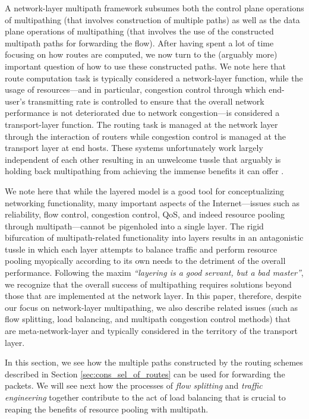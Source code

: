 \documentclass[10pt]{IEEEtran}
\begin{document}
A network-layer multipath framework subsumes both the control plane operations of multipathing (that involves construction of multiple paths) as well as the data plane operations of multipathing (that involves the use of the constructed multipath paths for forwarding the flow). After having spent a lot of time focusing on how routes are computed, we now turn to the (arguably more) important question of how to use these constructed paths. We note here that route computation task is typically considered a network-layer function, while the usage of resources---and in particular, congestion control through which end-user's transmitting rate is controlled to ensure that the overall network performance is not deteriorated due to network congestion---is considered a transport-layer function. The routing task is managed at the network layer through the interaction of routers while congestion control is managed at the transport layer at end hosts. These systems unfortunately work largely independent of each other resulting in an unwelcome tussle that arguably is holding back multipathing from achieving the immense benefits it can offer \cite{araujo2010mutualistic}.

We note here that while the layered model is a good tool for conceptualizing networking functionality, many important aspects of the Internet---issues such as reliability, flow control, congestion control, QoS, and indeed resource pooling through multipath---cannot be pigenholed into a single layer. The rigid bifurcation of multipath-related functionality into layers results in an antagonistic tussle in which each layer attempts to balance traffic and perform resource pooling myopically according to its own needs to the detriment of the overall performance. Following the maxim \textit{``layering is a good servant, but a bad master''}, we recognize that the overall success of multipathing requires solutions beyond those that are implemented at the network layer. In this paper, therefore, despite our focus on network-layer multipathing, we also describe related issues (such as flow splitting, load balancing, and multipath congestion control methods) that are meta-network-layer and typically considered in the territory of the transport layer.



In this section, we see how the multiple paths constructed by the routing schemes described in Section \ref{sec:cons_sel_of_routes} can be used for forwarding the packets. We will see next how the processes of \textit{flow splitting} and \textit{traffic engineering} together contribute to the act of load balancing that is crucial to reaping the benefits of resource pooling with multipath.
\end{document}
